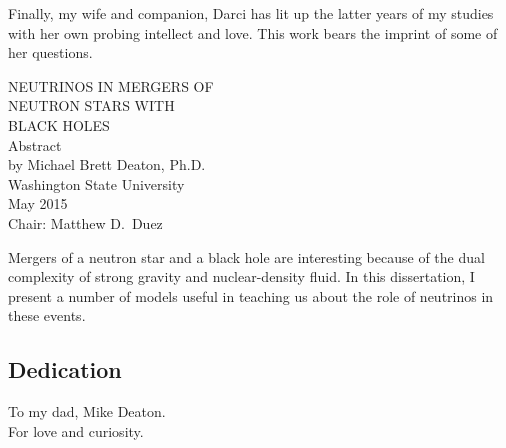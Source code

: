 \documentclass[12pt]{report}
\begin{document}
  Finally, my wife and companion, Darci has lit up the latter years of my
  studies with her own probing intellect and love. This work bears the imprint
  of some of her questions.

\newpage

\begin{center}
  \begin{singlespace}
    \label{ssec:abstract}

    {\uppercase{
        Neutrinos in Mergers of\\
        Neutron Stars with\\
        Black Holes}}\\
    \bigskip
    Abstract\\
    \bigskip \bigskip \bigskip
    by Michael Brett Deaton, Ph.D.\\
    Washington State University\\
    May 2015\\
    \bigskip \bigskip \bigskip
    Chair: Matthew D.\ Duez
  \end{singlespace}
\end{center}
  
Mergers of a neutron star and a black hole are interesting because of the dual
complexity of strong gravity and nuclear-density fluid. In this dissertation,
I present a number of models useful in teaching us about the role of neutrinos
in these events.
\newpage

\tableofcontents
\newpage

\listoftables
{} %
\newpage

\listoffigures
{} %
\newpage

\begin{center}
  \null
  \vspace{1.5in}
  \subsection*{Dedication}
  \bigskip
  To my dad, Mike Deaton.\\
  For love and curiosity.
  \newpage
\end{center}


\end{document}
